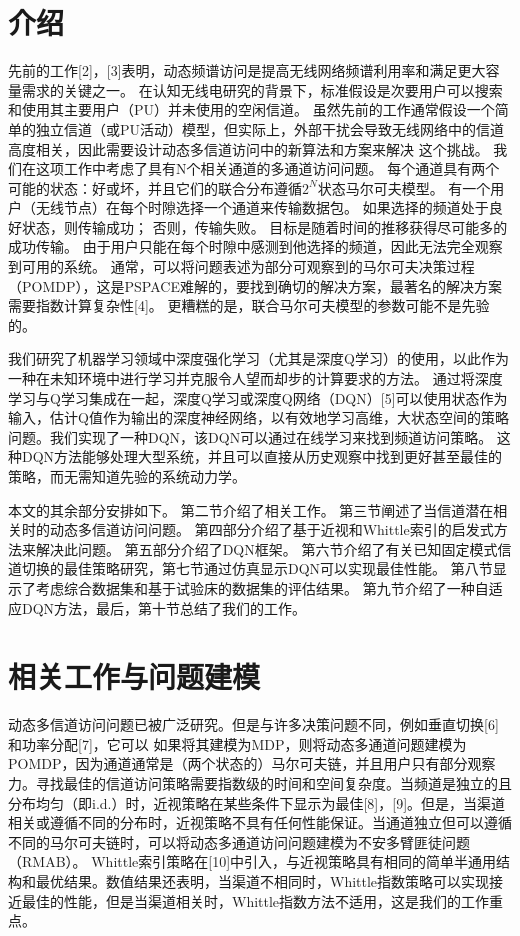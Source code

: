\section*{ 介绍 }
先前的工作[2]，[3]表明，动态频谱访问是提高无线网络频谱利用率和满足更大容量需求的关键之一。 在认知无线电研究的背景下，标准假设是次要用户可以搜索和使用其主要用户（PU）并未使用的空闲信道。 虽然先前的工作通常假设一个简单的独立信道（或PU活动）模型，但实际上，外部干扰会导致无线网络中的信道高度相关，因此需要设计动态多信道访问中的新算法和方案来解决 这个挑战。
我们在这项工作中考虑了具有N个相关通道的多通道访问问题。 每个通道具有两个可能的状态：好或坏，并且它们的联合分布遵循$2^{N}$状态马尔可夫模型。 有一个用户（无线节点）在每个时隙选择一个通道来传输数据包。 如果选择的频道处于良好状态，则传输成功； 否则，传输失败。 目标是随着时间的推移获得尽可能多的成功传输。 由于用户只能在每个时隙中感测到他选择的频道，因此无法完全观察到可用的系统。 通常，可以将问题表述为部分可观察到的马尔可夫决策过程（POMDP），这是PSPACE难解的，要找到确切的解决方案，最著名的解决方案需要指数计算复杂性[4]。 更糟糕的是，联合马尔可夫模型的参数可能不是先验的。

我们研究了机器学习领域中深度强化学习（尤其是深度Q学习）的使用，以此作为一种在未知环境中进行学习并克服令人望而却步的计算要求的方法。 通过将深度学习与Q学习集成在一起，深度Q学习或深度Q网络（DQN）[5]可以使用状态作为输入，估计Q值作为输出的深度神经网络，以有效地学习高维，大状态空间的策略 问题。我们实现了一种DQN，该DQN可以通过在线学习来找到频道访问策略。 这种DQN方法能够处理大型系统，并且可以直接从历史观察中找到更好甚至最佳的策略，而无需知道先验的系统动力学。

本文的其余部分安排如下。 第二节介绍了相关工作。 第三节阐述了当信道潜在相关时的动态多信道访问问题。 第四部分介绍了基于近视和Whittle索引的启发式方法来解决此问题。 第五部分介绍了DQN框架。 第六节介绍了有关已知固定模式信道切换的最佳策略研究，第七节通过仿真显示DQN可以实现最佳性能。 第八节显示了考虑综合数据集和基于试验床的数据集的评估结果。 第九节介绍了一种自适应DQN方法，最后，第十节总结了我们的工作。

\section*{  相关工作与问题建模  }
动态多信道访问问题已被广泛研究。但是与许多决策问题不同，例如垂直切换[6]和功率分配[7]，它可以
如果将其建模为MDP，则将动态多通道问题建模为POMDP，因为通道通常是（两个状态的）马尔可夫链，并且用户只有部分观察力。寻找最佳的信道访问策略需要指数级的时间和空间复杂度。当频道是独立的且分布均匀（即i.d.）时，近视策略在某些条件下显示为最佳[8]，[9]。但是，当渠道相关或遵循不同的分布时，近视策略不具有任何性能保证。当通道独立但可以遵循不同的马尔可夫链时，可以将动态多通道访问问题建模为不安多臂匪徒问题（RMAB）。 Whittle索引策略在[10]中引入，与近视策略具有相同的简单半通用结构和最优结果。数值结果还表明，当渠道不相同时，Whittle指数策略可以实现接近最佳的性能，但是当渠道相关时，Whittle指数方法不适用，这是我们的工作重点。

